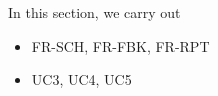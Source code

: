 
In this section, we carry out

\begin{itemize}
  \item FR-SCH, FR-FBK, FR-RPT
  \item UC3, UC4, UC5
\end{itemize}
